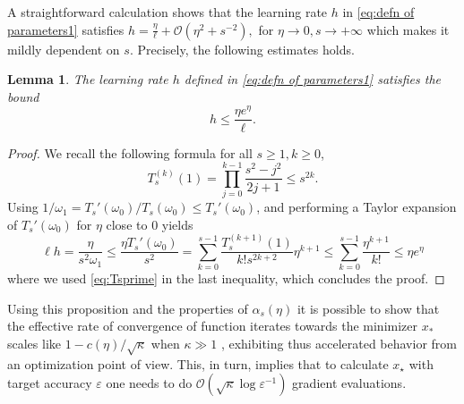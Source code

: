 \documentclass[10pt,a4paper]{article}
\newtheorem{lemma}[theorem]{Lemma}
\newtheorem{remark}[theorem]{Remark}
\renewcommand{\epsilon}{\varepsilon}
\newcommand{\bigo}{\mathcal{O}}
\begin{document}
    A straightforward calculation shows that the learning rate $h$ in \eqref{eq:defn of parameters1} satisfies
    $
    h= \tfrac{\eta}{\ell} + \bigo(\eta^2 + s^{-2}),
    $
    for $\eta\rightarrow 0, s\rightarrow +\infty$ which makes it mildly dependent on $s$. %
Precisely, the following estimates holds.
\begin{lemma}
The learning rate $h$ defined in \eqref{eq:defn of parameters1} satisfies the bound
\begin{equation} \label{eq:h_bound}
h\leq \frac{\eta e^\eta}{\ell}.
   \end{equation}
\end{lemma}
\begin{proof}
We recall the following formula for all $s\geq 1,k\geq 0$,
\begin{equation} \label{eq:Tsprime}
T_s^{(k)}(1) = \prod_{j=0}^{k-1} \frac{s^2-j^2}{2j+1} \leq s^{2k}.
\end{equation} 
Using $1/\omega_1 = T_s'(\omega_0)/T_s(\omega_0)\leq T_s'(\omega_0)$, and performing a Taylor expansion of $T_s'(\omega_0)$ for $\eta$ close to 
$0$ yields
$$
\ell h=\frac{\eta}{s^2\omega_1} \leq \frac{\eta T_s'(\omega_0)}{s^2}
=\sum_{k=0}^{s-1} \frac{T_s^{(k+1)}(1)}{k! s^{2k+2} }{\eta^{k+1}} \leq 
\sum_{k=0}^{s-1} \frac{\eta^{k+1}}{k!} \leq \eta e^\eta
$$
where we used \eqref{eq:Tsprime} in the last inequality, which concludes the proof. 
\end{proof}
Using this proposition and the properties of $\alpha_{s}(\eta)$  it is possible to show that the effective rate of convergence of function iterates towards the minimizer $x_{*}$ scales like $1-c(\eta)/\sqrt{\kappa}$  when $\kappa \gg 1$ \cite{EVVZ21}, exhibiting thus accelerated behavior from an optimization point of view. This, in turn, implies that  to calculate $x_{\star}$ with target  accuracy $\epsilon$ one needs to do $\mathcal{O}(\sqrt{\kappa}\log{\epsilon^{-1}})$ gradient evaluations. 


 
\end{document}
